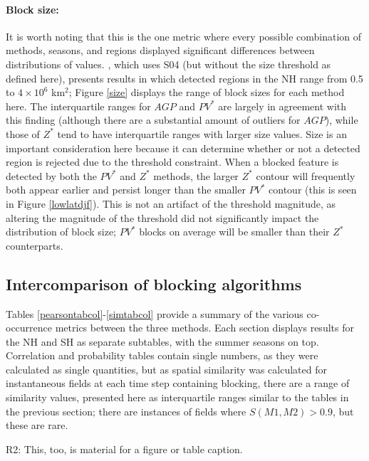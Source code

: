 \documentclass[smallextended]{svjour3}       %
\numberwithin{equation}{section}
\begin{document}
\paragraph{Block size:} {\color{blue}It is worth noting that this is the one metric where every possible combination of methods, seasons, and regions displayed significant differences between distributions of values.} \cite{croci-maspoli_multifaceted_2007}, which uses S04 (but without the size threshold as defined here), presents results in which detected regions in the NH range from 0.5 to $4\times 10^6$ km$^2$; Figure \ref{size} displays the range of block sizes for each method here. The interquartile ranges for $AGP$ and $PV^*$ are largely in agreement with this finding (although there are a substantial amount of outliers for $AGP$), while those of $Z^*$ tend to have interquartile ranges with larger size values. Size is an important consideration here because it can determine whether or not a detected region is rejected due to the threshold constraint. When a blocked feature is detected by both the $PV^*$ and $Z^*$ methods, the larger $Z^*$ contour will frequently both appear earlier and persist longer than the smaller $PV^*$ contour (this is seen in Figure \ref{lowlatdjf}). This is not an artifact of the threshold magnitude, as altering the magnitude of the threshold did not significantly impact the distribution of block size; $PV^*$ blocks on average will be smaller than their $Z^*$ counterparts.

\subsection{Intercomparison of blocking algorithms}\label{intercompare}

Tables \ref{pearsontabcol}-\ref{simtabcol} provide a summary of the various co-occurrence metrics between the three methods. Each section displays results for the NH and SH as separate subtables, with the summer seasons on top. Correlation and probability tables contain single numbers, as they were calculated as single quantities, but as spatial similarity was calculated for instantaneous fields at each time step containing blocking, there are a range of similarity values, presented here as interquartile ranges similar to the tables in the previous section; there are instances of fields where $S(M1,M2)>0.9$, but these are rare. 

{\color{teal}R2: This, too, is material for a figure or table caption.}
\end{document}
